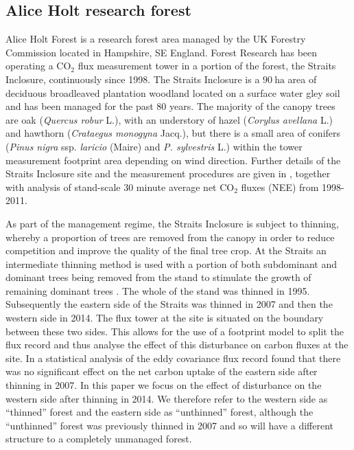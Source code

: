 \documentclass[draft,linenumbers]{agujournal}
\begin{document}
\subsection{Alice Holt research forest} \label{sec:site_description}

Alice Holt Forest is a research forest area managed by the UK Forestry Commission located in Hampshire, SE England. Forest Research has been operating a $\text{CO}_{2}$ flux measurement tower in a portion of the forest, the Straits Inclosure, continuously since 1998. The Straits Inclosure is a $90~\text{ha}$ area of deciduous broadleaved plantation woodland located on a surface water gley soil and has been managed for the past 80 years. The majority of the canopy trees are oak (\textit{Quercus robur} L.), with an understory of hazel (\textit{Corylus avellana} L.) and hawthorn (\textit{Crataegus monogyna} Jacq.), but there is a small area of conifers (\textit{Pinus nigra} ssp. \textit{laricio} (Maire) and \textit{P. sylvestris} L.) within the tower measurement footprint area depending on wind direction. Further details of the Straits Inclosure site and the measurement procedures are given in \citet{wilkinson2012inter}, together with analysis of stand-scale $30$ minute average net $\text{CO}_{2}$ fluxes (NEE) from 1998-2011. 

As part of the management regime, the Straits Inclosure is subject to thinning, whereby a proportion of trees are removed from the canopy in order to reduce competition and improve the quality of the final tree crop. At the Straits an intermediate thinning method is used with a portion of both subdominant and dominant trees being removed from the stand {\color{blue}to stimulate the growth of remaining dominant trees} \citep{kerr2011thinning}. The whole of the stand was thinned in 1995. Subsequently the eastern side of the Straits was thinned in 2007 and then the western side in 2014. The flux tower at the site is situated on the boundary between these two sides. This allows for the use of a footprint model to split the flux record and thus analyse the effect of this disturbance on carbon fluxes at the site. In \citet{wilkinson2015effects} a statistical analysis of the eddy covariance flux record found that there was no significant effect on the net carbon uptake of the eastern side after thinning in 2007. In this paper we focus on the effect of disturbance on the western side after thinning in 2014. We therefore refer to the western side as ``thinned'' forest and the eastern side as ``unthinned'' forest, {\color{blue}although the ``unthinned'' forest was previously thinned in 2007 and so will have a different structure to a completely unmanaged forest}.   
\end{document}

